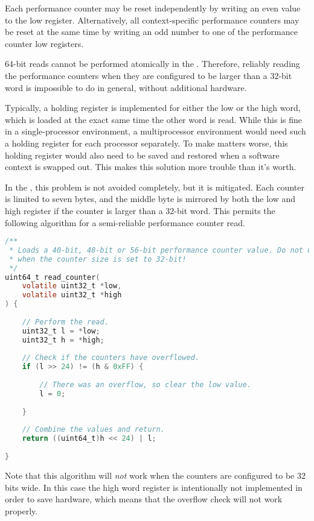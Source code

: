 Each performance counter may be reset independently by writing an even value to
the low register. Alternatively, all context-specific performance counters may
be reset at the same time by writing an odd number to one of the performance
counter low registers.

64-bit reads cannot be performed atomically in the \rvex{}. Therefore, reliably
reading the performance counters when they are configured to be larger than a
32-bit word is impossible to do in general, without additional hardware.

Typically, a holding register is implemented for either the low or the high
word, which is loaded at the exact same time the other word is read. While this
is fine in a single-processor environment, a multiprocessor environment would
need such a holding register for each processor separately. To make matters
worse, this holding register would also need to be saved and restored when a
software context is swapped out. This makes this solution more trouble than it's
worth.

In the \rvex{}, this problem is not avoided completely, but it is mitigated. 
Each counter is limited to seven bytes, and the middle byte is mirrored by both 
the low and high register if the counter is larger than a 32-bit word. This 
permits the following algorithm for a semi-reliable performance counter read.

\begin{lstlisting}[numbers=none, language=C]
/**
 * Loads a 40-bit, 48-bit or 56-bit performance counter value. Do not use this
 * when the counter size is set to 32-bit!
 */
uint64_t read_counter(
    volatile uint32_t *low,
    volatile uint32_t *high
) {
    
    // Perform the read.
    uint32_t l = *low;
    uint32_t h = *high;
    
    // Check if the counters have overflowed.
    if (l >> 24) != (h & 0xFF) {
        
        // There was an overflow, so clear the low value.
        l = 0;
        
    }
    
    // Combine the values and return.
    return ((uint64_t)h << 24) | l;
    
}
\end{lstlisting}

\noindent Note that this algorithm will \emph{not} work when the counters are
configured to be 32 bits wide. In this case the high word register is
intentionally not implemented in order to save hardware, which means that the
overflow check will not work properly.

